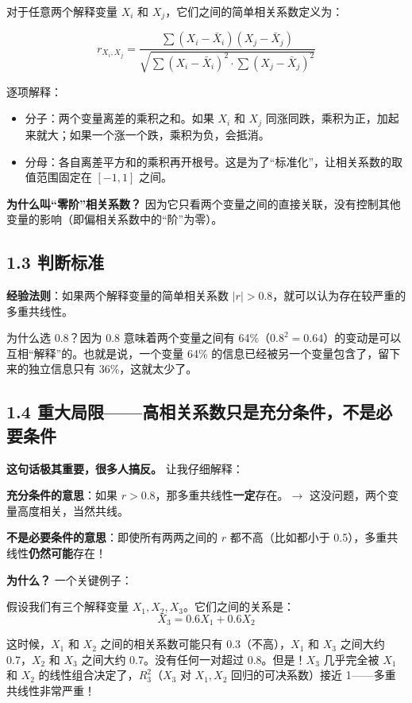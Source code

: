 \documentclass[12pt,a4paper]{ctexart}
\begin{document}
对于任意两个解释变量 $X_i$ 和 $X_j$，它们之间的简单相关系数定义为：

\begin{equation}
r_{X_i, X_j} = \frac{\sum (X_i - \bar{X}_i)(X_j - \bar{X}_j)}{\sqrt{\sum (X_i - \bar{X}_i)^2 \cdot \sum (X_j - \bar{X}_j)^2}}
\end{equation}

逐项解释：
\begin{itemize}
  \item 分子：两个变量离差的乘积之和。如果 $X_i$ 和 $X_j$ 同涨同跌，乘积为正，加起来就大；如果一个涨一个跌，乘积为负，会抵消。
  \item 分母：各自离差平方和的乘积再开根号。这是为了“标准化”，让相关系数的取值范围固定在 $[-1, 1]$ 之间。
\end{itemize}

\textbf{为什么叫“零阶”相关系数？} 因为它只看两个变量之间的直接关联，没有控制其他变量的影响（即偏相关系数中的“阶”为零）。

\subsection*{1.3 判断标准}

\textbf{经验法则}：如果两个解释变量的简单相关系数 $|r| > 0.8$，就可以认为存在较严重的多重共线性。

为什么选 0.8？因为 0.8 意味着两个变量之间有 64\%（$0.8^2 = 0.64$）的变动是可以互相“解释”的。也就是说，一个变量 64\% 的信息已经被另一个变量包含了，留下来的独立信息只有 36\%，这就太少了。

\subsection*{1.4 重大局限——高相关系数只是充分条件，不是必要条件}

\textbf{这句话极其重要，很多人搞反。} 让我仔细解释：

\textbf{充分条件的意思}：如果 $r > 0.8$，那多重共线性\textbf{一定}存在。$\rightarrow$ 这没问题，两个变量高度相关，当然共线。

\textbf{不是必要条件的意思}：即使所有两两之间的 $r$ 都不高（比如都小于 0.5），多重共线性\textbf{仍然可能}存在！

\textbf{为什么？} 一个关键例子：

假设我们有三个解释变量 $X_1, X_2, X_3$。它们之间的关系是：
\[
X_3 = 0.6 X_1 + 0.6 X_2
\]

这时候，$X_1$ 和 $X_2$ 之间的相关系数可能只有 0.3（不高），$X_1$ 和 $X_3$ 之间大约 0.7，$X_2$ 和 $X_3$ 之间大约 0.7。没有任何一对超过 0.8。但是！$X_3$ 几乎完全被 $X_1$ 和 $X_2$ 的线性组合决定了，$R_3^2$（$X_3$ 对 $X_1, X_2$ 回归的可决系数）接近 1——多重共线性非常严重！
\end{document}
